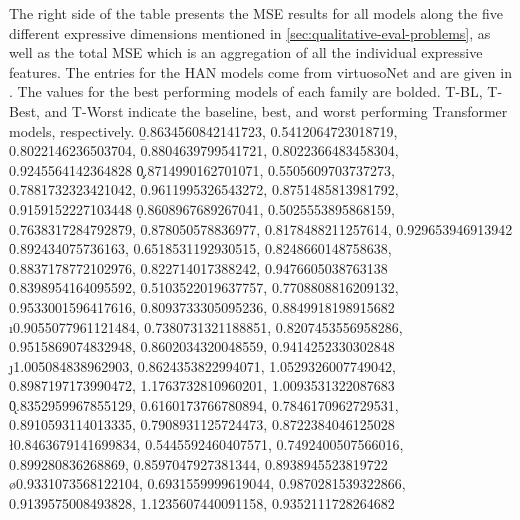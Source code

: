 \begin{appendices}
The right side of the table presents the MSE results for all models along the five different expressive dimensions mentioned in \ref{sec:qualitative-eval-problems}, as well as the total MSE which is an aggregation of all the individual expressive features. The entries for the HAN models come from virtuosoNet and are given in \cite{jeong2019virtuosonet}. The values for the best performing models of each family are bolded. T-BL, T-Best, and T-Worst indicate the baseline, best, and worst performing Transformer models, respectively. 
\readlist*{} %
\readlist*\b{0.8634560842141723, 0.5412064723018719, 0.8022146236503704, 0.8804639799541721, 0.8022366483458304, 0.9245564142364828} %
\readlist*\c{0.8714990162701071, 0.5505609703737273, 0.7881732323421042, 0.9611995326543272, 0.8751485813981792, 0.9159152227103448} %
\readlist*\d{0.8608967689267041, 0.5025553895868159, 0.7638317284792879, 0.878050578836977, 0.8178488211257614, 0.929653946913942} %
\readlist*{} %
\readlist*\f{0.892434075736163, 0.6518531192930515, 0.8248660148758638, 0.8837178772102976, 0.822714017388242, 0.9476605038763138} %
\readlist*{} %
\readlist*\h{0.8398954164095592, 0.5103522019637757, 0.7708808816209132, 0.9533001596417616, 0.8093733305095236, 0.8849918198915682} %
\readlist*\i{0.9055077961121484, 0.7380731321188851, 0.8207453556958286, 0.9515869074832948, 0.8602034320048559, 0.9414252330302848} %
\readlist*\j{1.005084838962903, 0.8624353822994071, 1.0529326007749042, 0.8987197173990472, 1.1763732810960201, 1.0093531322087683} %
\readlist*\k{0.8352959967855129, 0.6160173766780894, 0.7846170962729531, 0.8910593114013335, 0.7908931125724473, 0.8722384046125028} %
\readlist*\l{0.8463679141699834, 0.5445592460407571, 0.7492400507566016, 0.899280836268869, 0.8597047927381344, 0.8938945523819722} %
\readlist*{} %
\readlist*{} %
\readlist*\o{0.9331073568122104, 0.6931559999619044, 0.9870281539322866, 0.9139575008493828, 1.1235607440091158, 0.9352111728264682} %


\end{appendices}

